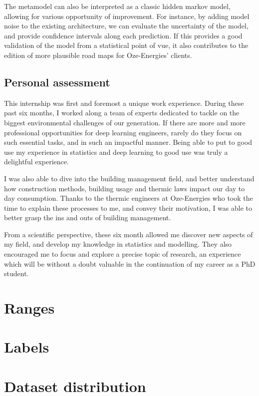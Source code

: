\documentclass[12pt]{article}
\begin{document}
The metamodel can also be interpreted as a classic hidden markov model, allowing for various opportunity of improvement. For instance, by adding model noise to the existing architecture, we can evaluate the uncertainty of the model, and provide confidence intervals along each prediction. If this provides a good validation of the model from a statistical point of vue, it also contributes to the edition of more plausible road maps for Oze-Energies' clients.

\subsection{Personal assessment}
This internship was first and foremost a unique work experience. During these past six months, I worked along a team of experts dedicated to tackle on the biggest environmental challenges of our generation. If there are more and more professional opportunities for deep learning engineers, rarely do they focus on such essential tasks, and in such an impactful manner. Being able to put to good use my experience in statistics and deep learning to good use was truly a delightful experience.

I was also able to dive into the building management field, and better understand how construction methods, building usage and thermic laws impact our day to day consumption. Thanks to the thermic engineers at Oze-Energies who took the time to explain these processes to me, and convey their motivation, I was able to better grasp the ins and outs of building management.

From a scientific perspective, these six month allowed me discover new aspects of my field, and develop my knowledge in statistics and modelling. They also encouraged me to focus and explore a precise topic of research, an experience which will be without a doubt valuable in the continuation of my career as a PhD student.



\clearpage
\appendix

\section{Ranges}


\section{Labels}


\section{Dataset distribution}

\end{document}
